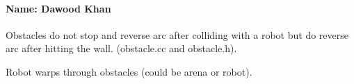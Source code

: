 \paragraph*{Name\+: Dawood Khan}

Obstacles do not stop and reverse arc after colliding with a robot but do reverse arc after hitting the wall. (obstacle.\+cc and obstacle.\+h).

Robot warps through obstacles (could be arena or robot). 
